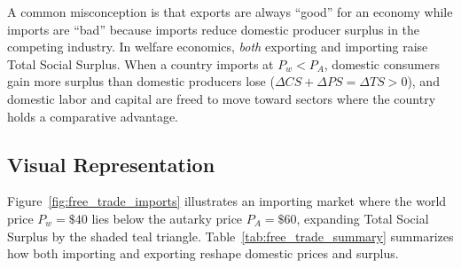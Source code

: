 \documentclass[11pt,letterpaper]{article}
\begin{document}
\begin{tcolorbox}[colback=CourseAmber!10!white,colframe=CourseOrange,title=\textbf{Clear It Up: Do Imports Subtract from National Welfare Because Domestic Producers Lose?}]
A common misconception is that exports are always ``good'' for an economy while imports are ``bad'' because imports reduce domestic producer surplus in the competing industry. In welfare economics, \emph{both} exporting and importing raise Total Social Surplus. When a country imports at $P_w < P_A$, domestic consumers gain more surplus than domestic producers lose ($\Delta CS + \Delta PS = \Delta TS > 0$), and domestic labor and capital are freed to move toward sectors where the country holds a comparative advantage.
\end{tcolorbox}

\subsection*{Visual Representation}
Figure~\ref{fig:free_trade_imports} illustrates an importing market where the world price $P_w = \$40$ lies below the autarky price $P_A = \$60$, expanding Total Social Surplus by the shaded teal triangle. Table~\ref{tab:free_trade_summary} summarizes how both importing and exporting reshape domestic prices and surplus.
\end{document}
